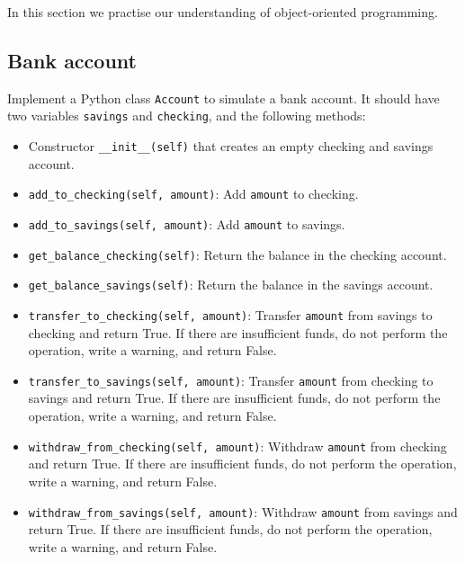 In this section we practise our understanding of object-oriented programming.


\subsection{Bank account}

Implement a Python class {\tt Account} to simulate a bank account. It 
should have two variables {\tt savings} and {\tt checking}, and the following methods:
\begin{itemize}
\item Constructor {\tt \_\_init\_\_(self)} that creates an empty checking and savings account.
\item {\tt add\_to\_checking(self, amount)}: Add {\tt amount} to checking.
\item {\tt add\_to\_savings(self, amount)}: Add {\tt amount} to savings.
\item {\tt get\_balance\_checking(self)}: Return the balance in the checking account.
\item {\tt get\_balance\_savings(self)}: Return the balance in the savings account.
\item {\tt transfer\_to\_checking(self, amount)}: Transfer {\tt amount} from savings to checking
      and return True.
      If there are insufficient funds, do not perform the operation, write a warning,
      and return False. 
\item {\tt transfer\_to\_savings(self, amount)}: Transfer {\tt amount} from checking to savings
      and return True.
      If there are insufficient funds, do not perform the operation, write a warning,
      and return False. 
\item {\tt withdraw\_from\_checking(self, amount)}: Withdraw {\tt amount} from checking
      and return True.
      If there are insufficient funds, do not perform the operation, write a warning,
      and return False. 
\item {\tt withdraw\_from\_savings(self, amount)}: Withdraw {\tt amount} from savings
      and return True.
      If there are insufficient funds, do not perform the operation, write a warning,
      and return False. 

\end{itemize}


